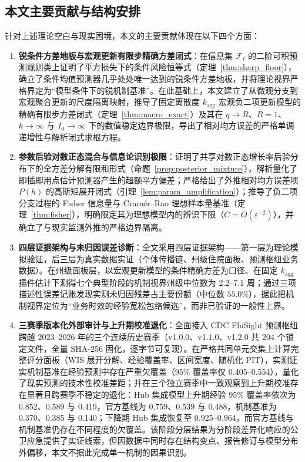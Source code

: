 \documentclass[11pt,a4paper]{article}
\theoremstyle{plain}
\theoremstyle{definition}
\begin{document}
\subsection{本文主要贡献与结构安排}

针对上述理论空白与现实困境，本文的主要贡献体现在以下四个方面：
\begin{enumerate}
\item \textbf{锐条件方差地板与宏观更新有限步精确方差闭式}：在信息集 $\mathcal{F}_t$ 的二阶可积预测规则类上证明了平方损失下的条件风险恒等式（定理~\ref{thm:sharp_floor}），确立了条件均值预测器几乎处处唯一达到的锐条件方差地板，并将理论视界严格界定为“模型条件下的锐机制基准”。在此基础上，本文建立了从微观分支到宏观聚合更新的尺度隔离映射，推导了固定离散度 $k_{\text{agg}}$ 宏观负二项更新模型的精确有限步方差闭式（定理~\ref{thm:macro_exact}）及其在 $q\to R$、$R=1$、$k\to\infty$ 与 $I_0\to\infty$ 下的数值稳定边界极限，导出了相对均方误差的严格单调递增性与解析闭式求根方程。
\item \textbf{参数后验对数正态混合与信息论识别极限}：证明了共享对数正态增长率后验分布下的全方差分解有限和形式（命题~\ref{prop:posterior_mixture}），解析量化了即插即用点估计预测器产生的超额平方偏差；严格给出了外推相对均方误差项 $P(h)$ 的高斯矩展开闭式（引理~\ref{lem:param_amplification}）；推导了负二项分支过程的 Fisher 信息量与 Cramér--Rao 理想样本量基准（定理~\ref{thm:fisher}），明确限定其为理想模型内的辨识下限（$C = O(\varepsilon^{-2})$），并确立了与现实监测外推的严格边界隔离。
\item \textbf{四层证据架构与未归因误差诊断}：全文采用四层证据架构——第一层为理论模拟验证，后三层为真实数据实证（个体传播链、州级住院面板、预测枢纽业务数据）。在州级面板层，以宏观更新模型的条件精确方差为口径、在固定 $k_{\text{agg}}$ 插件估计下测得七个典型阶段的机制视界州级中位数为 2.2--7.1 周；通过三项描述性误差记账发现实测未归因残差占主要份额（中位数 $55.0\%$），据此把机制视界定位为“业务时效的经验宽松包络候选”，而非已验证的一般性上界。
\item \textbf{三赛季版本化外部审计与上升期校准退化}：全面接入 CDC FluSight 预测枢纽跨越 2023--2026 年的三个连续历史赛季（v1.0.0、v1.1.0、v1.2.0 共 204 个锁定文件，全量 SHA-256 固化，逐字节可复现）。在严格共同单元交集上计算完整评分面板（WIS 展开分解、经验覆盖率、区间宽度、随机化 PIT），实测证实机制基准在经验预测中存在严重欠覆盖（95\% 覆盖率仅 0.405--0.554），量化了现实预测的技术性校准差距；并在三个独立赛季中一致观察到上升期校准存在显著且跨赛季不稳定的退化：Hub 集成模型上升期经验 95\% 覆盖率依次为 0.852、0.589 与 0.419，官方基线为 0.759、0.539 与 0.488，机制基准为 0.370、0.385 与 0.140；下降期 Hub 集成恢复至 0.925--0.964，而官方基线与机制基准仍存在不同程度的欠覆盖。该阶段分层结果为分阶段差异化响应的公卫应急提供了实证线索，但因数据中同时存在结构变点、报告修订与模型分布外偏移，本文不据此完成单一机制的因果识别。
\end{enumerate}
\end{document}
